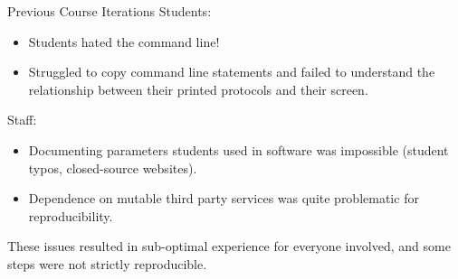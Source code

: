 \documentclass[final,t]{beamer}
\begin{document}
\begin{frame}[fragile]
\begin{columns}[t]
\begin{column}{.36\linewidth}
            \begin{block}{Previous Course Iterations}
                \justifying
                Students:
                \begin{itemize}
                    \item Students hated the command line!
                    \item Struggled to copy command line statements and failed
                        to understand the relationship between their printed
                        protocols and their screen.
                \end{itemize}
                Staff:
                \begin{itemize}
                    \item Documenting parameters students used in
                        software was impossible (student typos, closed-source websites).
                    \item Dependence on mutable third party services was
                        quite problematic for reproducibility.
                \end{itemize}

                These issues resulted in sub-optimal experience for everyone
                involved, and some steps were not strictly reproducible.
            \end{block}


\end{column}
\end{columns}
\end{frame}
\end{document}

